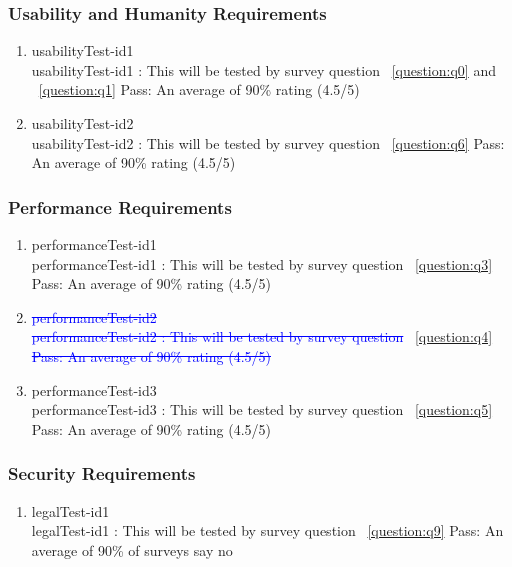 \documentclass[12pt, titlepage]{article}
\begin{document}
\subsubsection{Usability and Humanity Requirements}
\begin{enumerate}
\item{usabilityTest-id1\\}
usabilityTest-id1 : This will be tested by survey question ~\ref{question:q0} and ~\ref{question:q1}
\newline
	Pass: An average of 90\% rating (4.5/5)

\item{usabilityTest-id2\\}
usabilityTest-id2 : This will be tested by survey question ~\ref{question:q6}
\newline
	Pass: An average of 90\% rating (4.5/5)


\end{enumerate}

\subsubsection{Performance Requirements}
\begin{enumerate}
\item{performanceTest-id1\\}
performanceTest-id1 : This will be tested by survey question ~\ref{question:q3}
\newline
	Pass: An average of 90\% rating (4.5/5)


\item{\textcolor{blue}{\st{performanceTest-id2}}\\}
\textcolor{blue}{\st{performanceTest-id2 : This will be tested by survey question}} ~\ref{question:q4}
\newline
	\textcolor{blue}{\st{Pass: An average of 90\% rating (4.5/5)}}

\item{performanceTest-id3\\}
performanceTest-id3 : This will be tested by survey question ~\ref{question:q5}
\newline
	Pass: An average of 90\% rating (4.5/5)


\end{enumerate}

\subsubsection{Security Requirements}
\begin{enumerate}
\item{legalTest-id1\\}
legalTest-id1 : This will be tested by survey question ~\ref{question:q9}
\newline
	Pass: An average of 90\% of surveys say no

\end{enumerate}
\end{document}
